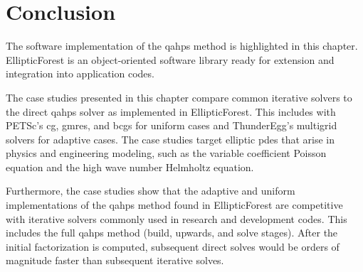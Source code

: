 \section{Conclusion}

The software implementation of the \gls{qahps} method is highlighted in this chapter. EllipticForest is an object-oriented software library ready for extension and integration into application codes.

The case studies presented in this chapter compare common iterative solvers to the direct \gls{qahps} solver as implemented in EllipticForest. This includes with PETSc's \gls{cg}, \gls{gmres}, and \gls{bcgs} for uniform cases and ThunderEgg's multigrid solvers for adaptive cases. The case studies target elliptic \gls{pdes} that arise in physics and engineering modeling, such as the variable coefficient Poisson equation and the high wave number Helmholtz equation.

Furthermore, the case studies show that the adaptive and uniform implementations of the \gls{qahps} method found in EllipticForest are competitive with iterative solvers commonly used in research and development codes. This includes the full \gls{qahps} method (build, upwards, and solve stages). After the initial factorization is computed, subsequent direct solves would be orders of magnitude faster than subsequent iterative solves.